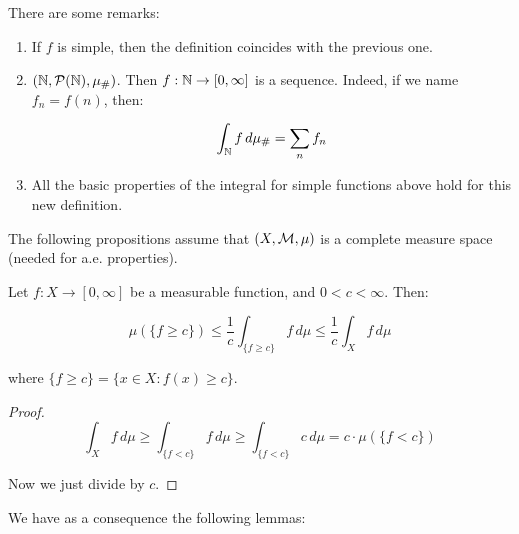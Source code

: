 \begin{fremark}
    There are some remarks:
    \vspace{1em}

    \begin{enumerate}
        \item If $f$ is simple, then the definition coincides with the previous one.
        \vspace{1em}

        \item $(\mathbb{N}, \mathcal{P}(\mathbb{N}), \mu_{\#})$. Then $f: \mathbb{N} \to [0, \infty]$ is a sequence. Indeed, if we
        name $f_n = f(n)$, then:

        $$\int_{\mathbb{N}} f \, d\mu_{\#} = \sum_{n} f_n$$
        \vspace{1em}

        \item All the basic properties of the integral for simple functions above hold for this
        new definition.
    \end{enumerate}

\end{fremark}

\vspace{1em}

\begin{note}
    The following propositions assume that $(X, \mathcal{M}, \mu)$ is a complete measure space (needed for
    a.e. properties).
\end{note}

\begin{fproposition}
    Let $f: X \to [0, \infty]$ be a measurable function, and $0 < c < \infty$. Then:
    
    $$\mu(\{f \geq c\}) \leq \frac{1}{c} \int_{\{f \geq c\}} f \, d\mu \leq \frac{1}{c} \int_{X} f \, d\mu$$

    where $\{f \geq c\} = \{x \in X: f(x) \geq c\}$.

\end{fproposition}

\begin{proof}
    $$\int_{X} f \, d\mu \geq \int_{\{f < c\}} f \, d\mu \geq \int_{\{f < c\}} c \, d\mu = c \cdot \mu(\{f < c\})$$

    Now we just divide by $c$.
\end{proof}

\begin{note}
    We have as a consequence the following lemmas:
\end{note}

